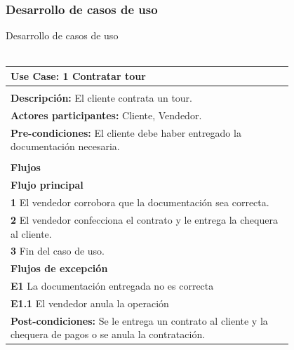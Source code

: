 \documentclass[12pt,a4paper,titlepage,oneside]{article}
\begin{document}
\subsubsection{Desarrollo de casos de uso}

Desarrollo de casos de uso
\\\

\begin{tabular}{| l | p{0.8\linewidth} |} \hline
	\multicolumn{2}{|p{0.8\linewidth}|}{\textbf{Use Case:} 1 Contratar tour} \\ \hline
	\multicolumn{2}{|c|}{} \\ \hline
	\multicolumn{2}{|p{0.8\linewidth}|}{\textbf{Descripci\'on:} El cliente contrata un tour.} \\ \hline
	\multicolumn{2}{|p{0.8\linewidth}|}{\textbf{Actores participantes:} Cliente, Vendedor.} \\ \hline
	\multicolumn{2}{|p{0.8\linewidth}|}{\textbf{Pre-condiciones:} El cliente debe haber entregado la documentación necesaria.} \\ \hline
	\multicolumn{2}{|c|}{} \\ \hline
	\multicolumn{2}{|p{0.8\linewidth}|}{\textbf{Flujos}} \\ \hline
	\multicolumn{2}{|p{0.8\linewidth}|}{\textbf{Flujo principal}} \\ \hline
	\multicolumn{2}{|p{0.8\linewidth}|}{\textbf{1} El vendedor corrobora que la documentación sea correcta.} \\ \hline
	\multicolumn{2}{|p{0.8\linewidth}|}{\textbf{2} El vendedor confecciona el contrato y le entrega la chequera al	cliente.} \\ \hline
	\multicolumn{2}{|p{0.8\linewidth}|}{\textbf{3} Fin del caso de uso.} \\ \hline
	\multicolumn{2}{|p{0.8\linewidth}|}{\textbf{Flujos de excepci\'on}} \\ \hline
	\multicolumn{2}{|p{0.8\linewidth}|}{\textbf{E1} La documentación entregada no es correcta} \\ \hline
	\multicolumn{2}{|p{0.8\linewidth}|}{\textbf{E1.1} El vendedor anula la operación} \\ \hline
	\multicolumn{2}{|p{0.8\linewidth}|}{\textbf{Post-condiciones:} Se le entrega un contrato al cliente y la chequera de pagos o se anula la contratación.}\\ \hline
\end{tabular} \\\\
 \\\\
\end{document}
